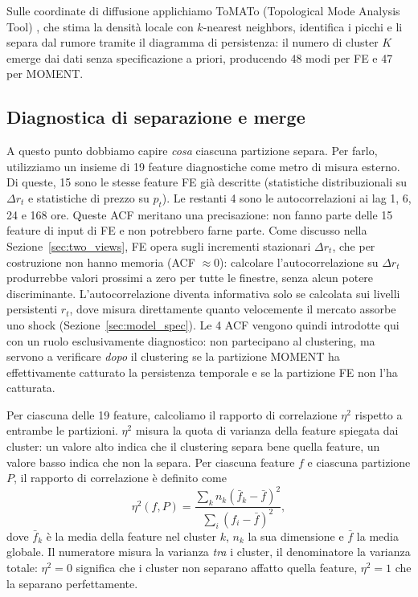 \documentclass[12pt]{article}
\begin{document}
Sulle coordinate di diffusione applichiamo ToMATo (Topological Mode Analysis Tool) \citep{chazal2013}, che stima la densità locale con $k$-nearest neighbors, identifica i picchi e li separa dal rumore tramite il diagramma di persistenza: il numero di cluster $K$ emerge dai dati senza specificazione a priori, producendo 48 modi per FE e 47 per MOMENT.
\subsection{Diagnostica di separazione e merge}
\label{sec:cross_projection}

A questo punto dobbiamo capire \emph{cosa} ciascuna partizione separa.
Per farlo, utilizziamo un insieme di 19 feature diagnostiche come metro di misura esterno.
Di queste, 15 sono le stesse feature FE già descritte (statistiche distribuzionali su $\Delta r_t$ e statistiche di prezzo su $p_t$).
Le restanti 4 sono le autocorrelazioni ai lag 1, 6, 24 e 168 ore.
Queste ACF meritano una precisazione: non fanno parte delle 15 feature di input di FE e non potrebbero farne parte.
Come discusso nella Sezione~\ref{sec:two_views}, FE opera sugli incrementi stazionari $\Delta r_t$, che per costruzione non hanno memoria (ACF $\approx 0$): calcolare l'autocorrelazione su $\Delta r_t$ produrrebbe valori prossimi a zero per tutte le finestre, senza alcun potere discriminante.
L'autocorrelazione diventa informativa solo se calcolata sui livelli persistenti $r_t$, dove misura direttamente quanto velocemente il mercato assorbe uno shock (Sezione~\ref{sec:model_spec}).
Le 4 ACF vengono quindi introdotte qui con un ruolo esclusivamente diagnostico: non partecipano al clustering, ma servono a verificare \emph{dopo} il clustering se la partizione MOMENT ha effettivamente catturato la persistenza temporale e se la partizione FE non l'ha catturata.

Per ciascuna delle 19 feature, calcoliamo il rapporto di correlazione $\eta^2$ \citep{fisher1925} rispetto a entrambe le partizioni.
$\eta^2$ misura la quota di varianza della feature spiegata dai cluster: un valore alto indica che il clustering separa bene quella feature, un valore basso indica che non la separa.
Per ciascuna feature $f$ e ciascuna partizione $P$, il rapporto di correlazione è definito come
\begin{equation}
\eta^2(f, P) = \frac{\sum_k n_k (\bar{f}_k - \bar{f})^2}{\sum_i (f_i - \bar{f})^2},
\label{eq:eta2}
\end{equation}
dove $\bar{f}_k$ è la media della feature nel cluster $k$, $n_k$ la sua dimensione e $\bar{f}$ la media globale.
Il numeratore misura la varianza \emph{tra} i cluster, il denominatore la varianza totale: $\eta^2 = 0$ significa che i cluster non separano affatto quella feature, $\eta^2 = 1$ che la separano perfettamente.
\end{document}
